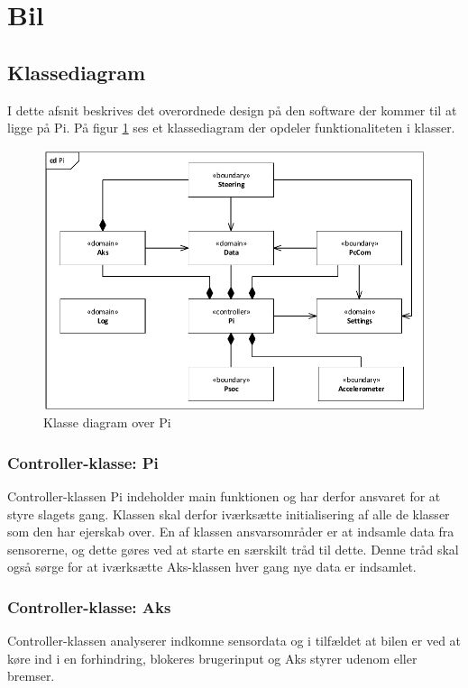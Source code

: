 \section{Bil} \label{sec:bil}

\subsection{Klassediagram}
I dette afsnit beskrives det overordnede design på den software der kommer til at ligge på Pi. På figur \ref{fig:cd_pi} ses et klassediagram der opdeler funktionaliteten i klasser.

\begin{figure}[h]
\centering
\includegraphics[width=\textwidth* 9/10]{../fig/diagrammer/bil/cd_pi.pdf}
\caption{Klasse diagram over Pi}
\label{fig:cd_pi}
\end{figure}

\subsubsection{Controller-klasse: Pi}
Controller-klassen Pi indeholder main funktionen og har derfor ansvaret for at styre slagets gang. Klassen skal derfor iværksætte initialisering af alle de klasser som den har ejerskab over. En af klassen ansvarsområder er at indsamle data fra sensorerne, og dette gøres ved at starte en særskilt tråd til dette. Denne tråd skal også sørge for at iværksætte Aks-klassen hver gang nye data er indsamlet.

\subsubsection{Controller-klasse: Aks}
Controller-klassen analyserer indkomne sensordata og i tilfældet at bilen er ved at køre ind i en forhindring, blokeres brugerinput og Aks styrer udenom eller bremser.

